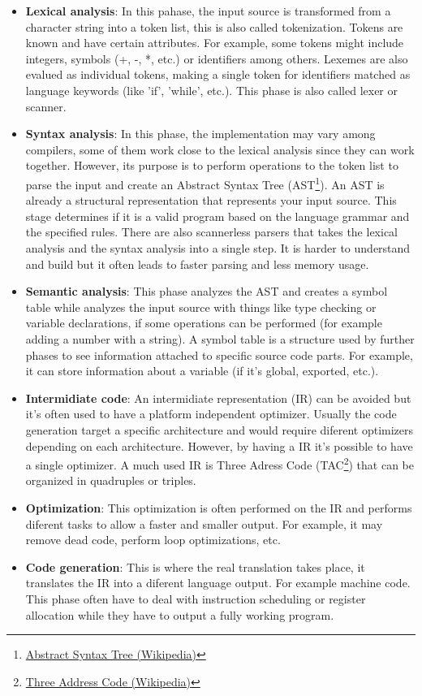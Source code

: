 \begin{itemize}
    \item \textbf{Lexical analysis}: In this pahase, the input source is transformed from a character string into a token list, this is also called
        tokenization. Tokens are known and have certain attributes. For example, some tokens might include integers, symbols (+, -, *, etc.) or
        identifiers among others. Lexemes are also evalued as individual tokens, making a single token for identifiers matched as language keywords
        (like 'if', 'while', etc.). This phase is also called lexer or scanner.
    \item \textbf{Syntax analysis}: In this phase, the implementation may vary among compilers, some of them work close to the lexical analysis since they
        can work together. However, its purpose is to perform operations to the token list to parse the input and create an Abstract Syntax Tree
        (AST\footnote{\href{https://en.wikipedia.org/wiki/Abstract_syntax_tree}{Abstract Syntax Tree (Wikipedia)}}). An AST is already a structural representation
        that represents your input source. This stage determines if it is a valid program based on the language grammar and the specified rules. There are also
        scannerless parsers that takes the lexical analysis and the syntax analysis into a single step. It is harder to understand and build but it often leads to
        faster parsing and less memory usage.
    \item \textbf{Semantic analysis}: This phase analyzes the AST and creates a symbol table while analyzes the input source with things like type checking or
        variable declarations, if some operations can be performed (for example adding a number with a string). A symbol table is a structure used by further
        phases to see information attached to specific source code parts. For example, it can store information about a variable (if it's global, exported, etc.).
    \item \textbf{Intermidiate code}: An intermidiate representation (IR) can be avoided but it's often used to have a platform independent optimizer. Usually
        the code generation target a specific architecture and would require diferent optimizers depending on each architecture. However, by having a IR it's possible
        to have a single optimizer. A much used IR is Three Adress Code (TAC\footnote{\href{https://en.wikipedia.org/wiki/Three-address_code}{Three Address Code (Wikipedia)}})
        that can be organized in quadruples or triples.
    \item \textbf{Optimization}: This optimization is often performed on the IR and performs diferent tasks to allow a faster and smaller output. For example, it may
        remove dead code, perform loop optimizations, etc.
    \item \textbf{Code generation}: This is where the real translation takes place, it translates the IR into a diferent language output. For example machine code.
        This phase often have to deal with instruction scheduling or register allocation while they have to output a fully working program.
\end{itemize}

